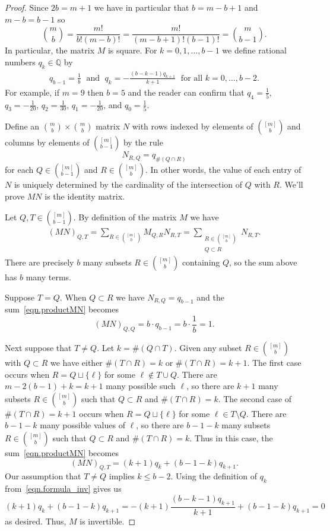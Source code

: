 \documentclass[11pt]{amsart}
\theoremstyle{remark}
\theoremstyle{remark}
\theoremstyle{definition}
\theoremstyle{definition}
\theoremstyle{definition}
\numberwithin{equation}{section}
\newcommand{\Q}{\mathbb{ Q}}           %
\begin{document}
\begin{proof} Since $2b = m+1$ we have in particular that $b=m-b+1$ and $m-b=b-1$ so
\[
\binom{m}{b} = \frac{m!}{b!(m-b)!} =  \frac{m!}{(m-b+1)! (b-1)!} = \binom{m}{b-1}.
\]
In particular, the matrix $M$ is square. For $k = 0, 1, \ldots, b-1$ we define rational numbers $q_k\in \Q$ by 
\begin{align}\label{eqn.formula_inv}
q_{b-1} = \frac{1}{b} \; \text{ and } \; q_{k} = -\frac{(b-k-1)q_{k+1}}{k+1} \; \text{ for all $k=0, \ldots, b-2$}.
\end{align}
For example, if $m=9$ then $b=5$ and the reader can confirm that $q_4 = \frac{1}{5}$, $q_3 =-\frac{1}{20}$, $q_2 = \frac{1}{30}$, $q_1= -\frac{1}{20}$, and $q_0 = \frac{1}{5}$. 

Define an $\binom{m}{b}\times \binom{m}{b}$ matrix $N$ with rows indexed by elements of $\binom{[m]}{b}$ and columns by elements of $\binom{[m]}{b-1}$ by the rule 
\[
N_{R,Q} = q_{\#(Q\cap R)} 
\]
for each $Q\in \binom{[m]}{b-1}$ and $R\in \binom{[m]}{b}$. In other words, the value of each entry of $N$ is uniquely determined by the cardinality of the intersection of $Q$ with $R$.  We'll prove $MN$ is the identity matrix. 

Let $Q,T\in \binom{[m]}{b-1}$. 
By definition of the matrix $M$ we have
\begin{align}\label{eqn.productMN}
(MN)_{Q,T} = \sum_{R\in \binom{[m]}{b}} M_{Q,R}N_{R,T} = \sum_{\substack{R\in \binom{[m]}{b}\\ Q \subset R}} N_{R,T} .
\end{align}
There are precisely $b$ many subsets $R\in \binom{[m]}{b}$ containing $Q$, so the sum above has $b$ many terms. 

Suppose $T=Q$. When $Q\subset R$ we have $N_{R,Q}=q_{b-1}$ and the sum~\eqref{eqn.productMN} becomes
\[
(MN)_{Q,Q} = b \cdot q_{b-1} = b \cdot \frac{1}{b} = 1.
\]

Next suppose that $T\neq Q$. Let $k = \#(Q\cap T)$.  Given any subset $R\in \binom{[m]}{b}$ with $Q\subset R$ we have either $\#(T\cap R)=k$ or $\#(T\cap R) = k+1$. The first case occurs when $R=Q\sqcup\{\ell\}$ for some $\ell\notin T\cup Q$. There are $m-2(b-1)+k = k+1$ many possible such $\ell$, so there are $k+1$ many subsets $R\in \binom{[m]}{b}$ such that $Q\subset R$ and $\#(T\cap R) = k$. The second case of $\#(T\cap R)=k+1$ occurs when $R=Q\sqcup \{\ell\}$ for some $\ell\in T\setminus Q$. There are $b-1-k$ many possible values of $\ell$, so there are $b-1-k$ many subsets $R\in \binom{[m]}{b}$ such that $Q\subset R$ and $\#(T\cap R) = k$. Thus in this case, the sum~\eqref{eqn.productMN} becomes
\[
(MN)_{Q,T} = (k+1)q_k + (b-1-k)q_{k+1}.
\]
Our assumption that $T\neq Q$ implies $k\leq b-2$. Using the definition of $q_k$ from~\eqref{eqn.formula_inv} gives us
\[
(k+1)q_k + (b-1-k)q_{k+1} = -(k+1)\frac{(b-k-1)q_{k+1}}{k+1} + (b-1-k)q_{k+1}=0
\]
as desired. Thus, $M$ is invertible. 
\end{proof}
\end{document}
